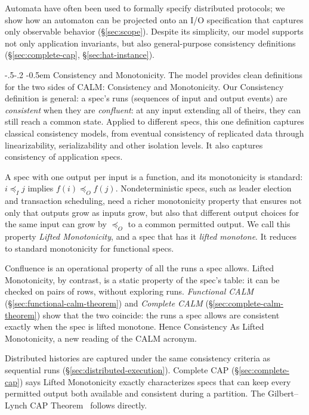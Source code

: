 \documentclass[sigconf]{cidr-2027}
\makeatletter
\theoremstyle{remark}
\renewcommand\paragraph{\@startsection{paragraph}{4}{\z@}%
  {-.5\baselineskip \@plus -2\p@ \@minus -.2\p@}%
  {-0.5em}%
  {\normalfont\bfseries}}
\newcommand{\InputOrd}{\preceq_I}
\newcommand{\OutputOrd}{\preceq_O}
\newcommand{\spectype}[1][]{I/O specification#1\xspace}
\newif\ifshowrv \showrvfalse
\newcommand{\rv}[1]{\ifshowrv\textsuperscript{\textcolor{magenta}{\textbf{R#1}}}\fi}
\makeatother
\begin{document}
\textcolor{newblue}{Automata have often been used to formally specify distributed
protocols; we show how an automaton can be projected onto an \spectype[] that
captures only observable behavior (\S\ref{sec:scope}).} \textcolor{newblue}{Despite its simplicity, our model supports not only application invariants, but also general-purpose consistency definitions (\S\ref{sec:complete-cap},
\S\ref{sec:hat-instance}).}

\paragraph{Consistency and Monotonicity.}
The model provides clean definitions for the two sides of CALM: Consistency
and Monotonicity. \textcolor{newblue}{Our Consistency definition is general: a spec's runs
(sequences of input and output events) are \emph{consistent} when they are
\emph{confluent}: at any input extending all of theirs, they can still reach a
common state.\rv{7}  Applied to different specs,
this one definition captures classical consistency models, from eventual consistency of replicated data
through linearizability, serializability and other isolation levels.} It also captures consistency of application specs.

A spec with one output per input is a function, and its monotonicity is standard: $i\InputOrd j$
implies $f(i)\OutputOrd f(j)$. Nondeterministic specs, such as leader election
and transaction scheduling, need a richer monotonicity property that ensures
not only that outputs grow as inputs grow, but also that different output
choices for the same input can grow by $\OutputOrd$ to a common permitted
output. We call this property \emph{Lifted Monotonicity}, and a spec that has
it \emph{lifted monotone}. It reduces to standard monotonicity for functional specs.

Confluence is an operational property of all the runs a spec allows. Lifted Monotonicity,
by contrast, is a static property of the spec's table: it can be checked on
pairs of rows, without exploring runs. \textcolor{newblue}{\emph{Functional CALM}
(\S\ref{sec:functional-calm-theorem}) and \emph{Complete CALM}
(\S\ref{sec:complete-calm-theorem}) show that the two coincide: the runs a spec allows are consistent exactly when the spec is
lifted monotone.} Hence Consistency As Lifted Monotonicity, a new reading of the
CALM acronym.

\textcolor{newblue}{Distributed histories are captured under the same consistency criteria as
sequential runs (\S\ref{sec:distributed-execution}).} \textcolor{newblue}{Complete CAP
(\S\ref{sec:complete-cap}) says Lifted Monotonicity exactly characterizes specs
that can keep every permitted output both available and consistent during a
partition.} The Gilbert--Lynch CAP Theorem~\cite{gilbert2002cap} follows directly.
\end{document}

